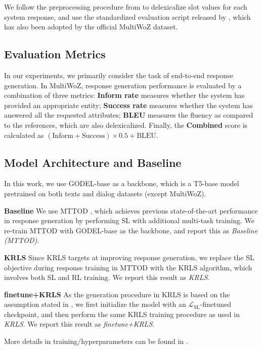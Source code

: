We follow the preprocessing procedure from \citet{multiwoz-preprocess} to delexicalize slot values for each system response, and use the standardized evaluation script released by \citet{multiwoz-eval}, which has also been adopted by the official MultiWoZ dataset.

\subsection{Evaluation Metrics}
\label{sec:Evaluation Metrics}
In our experiments, we primarily consider the task of end-to-end response generation. In MultiWoZ, response generation performance is evaluated by a combination of three metrics: \textbf{Inform rate} measures whether the system has provided an appropriate entity; \textbf{Success rate} measures whether the system has answered all the requested attributes; \textbf{BLEU} measures the fluency as compared to the references, which are also delexicalized. Finally, the \textbf{Combined} score is calculated as $(\mathrm{Inform}+\mathrm{Success}) \times 0.5 +\mathrm{BLEU}$.
\subsection{Model Architecture and Baseline}
\label{sec:Model Architecture and Baseline}
In this work, we use GODEL-base \cite{godel} as a backbone, which is a T5-base model \cite{T5} pretrained on both texts and dialog datasets (except MultiWoZ).

\textbf{Baseline} We use MTTOD \cite{mttod}, which achieves previous state-of-the-art performance in response generation by performing SL with additional multi-task training. We re-train MTTOD with GODEL-base \cite{godel} as the backbone, and report this as \emph{Baseline (MTTOD)}.

\textbf{KRLS} Since KRLS targets at improving response generation, we replace the SL objective during response training in MTTOD with the KRLS algorithm, which involves both SL and RL training. We report this result as \emph{KRLS}.

\textbf{finetune+KRLS} 
As the generation procedure in KRLS is based on the assumption stated in , we first initialize the model with an $\mathcal{L}_{\mathrm{SL}}$-finetuned checkpoint, and then perform the same KRLS training procedure as used in \emph{KRLS}. 
We report this result as \emph{finetune+KRLS}.

More details in training/hyperparameters can be found in .

